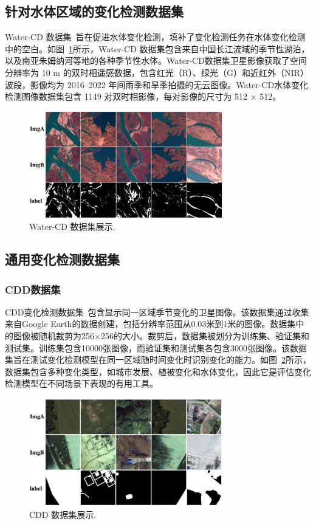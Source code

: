 \subsection{针对水体区域的变化检测数据集}
Water-CD 数据集~\cite{j_li_trsanet_2024}旨在促进水体变化检测，填补了变化检测任务在水体变化检测中的空白。如图~\ref{fig:watercd}所示，Water-CD 数据集包含来自中国长江流域的季节性湖泊，以及南亚朱姆纳河等地的各种季节性水体。Water-CD数据集卫星影像获取了空间分辨率为 10 m 的双时相遥感数据，包含红光（R）、绿光（G）和近红外（NIR）波段，影像均为 2016–2022 年间雨季和旱季拍摄的无云图像。Water-CD水体变化检测图像数据集包含 1149 对双时相影像，每对影像的尺寸为 512 × 512。

\begin{figure}[!htbp]
  \centering
  \includegraphics[width=0.75\textwidth]{paper_figures/变化检测任务与实验方法介绍/watercd.png}
  \caption{Water-CD 数据集展示.}
  \label{fig:watercd}
\end{figure}

\subsection{通用变化检测数据集}
\subsubsection{CDD数据集}
CDD变化检测数据集~\cite{Lebedev2018CHANGEDI}包含显示同一区域季节变化的卫星图像。该数据集通过收集来自Google Earth的数据创建，包括分辨率范围从0.03米到1米的图像。数据集中的图像被随机裁剪为256×256的大小。裁剪后，数据集被划分为训练集、验证集和测试集。训练集包含10000张图像，而验证集和测试集各包含3000张图像。该数据集旨在测试变化检测模型在同一区域随时间变化时识别变化的能力。如图~\ref{fig:cdd}所示，数据集包含多种变化类型，如城市发展、植被变化和水体变化，因此它是评估变化检测模型在不同场景下表现的有用工具。

\begin{figure}[!htbp]
  \centering
  \includegraphics[width=0.75\textwidth]{paper_figures/变化检测任务与实验方法介绍/cdd.png}
  \caption{CDD 数据集展示.}
  \label{fig:cdd}
\end{figure}

